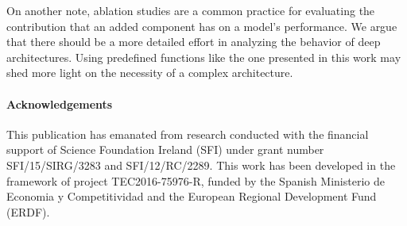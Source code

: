 \documentclass{bmvc2k}
\begin{document}
On another note, ablation studies are a common practice for evaluating the contribution that an added component has on a model's performance. We argue that there should be a more detailed effort in analyzing the behavior of deep architectures. Using predefined functions like the one presented in this work may shed more light on the necessity of a complex architecture.

\paragraph{Acknowledgements}
This publication has emanated from research conducted with the financial support of Science Foundation Ireland (SFI) under grant number SFI/15/SIRG/3283 and SFI/12/RC/2289. This work has been developed in the framework of project TEC2016-75976-R, funded by the Spanish Ministerio de Economia y Competitividad and the European Regional Development Fund (ERDF).



\end{document}

